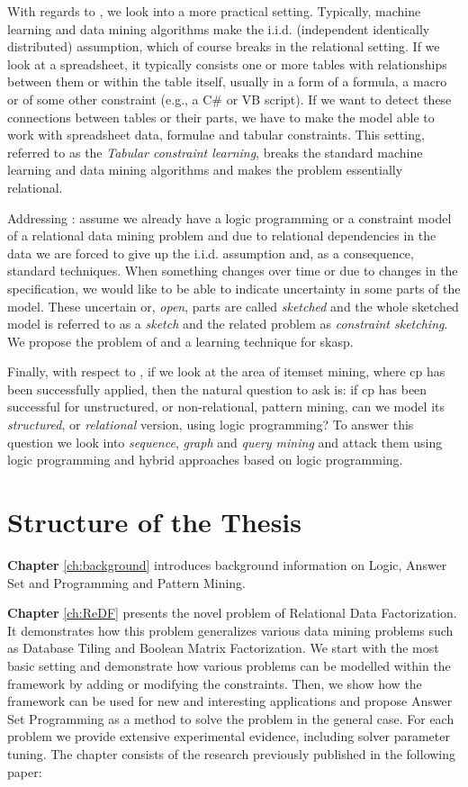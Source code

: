 With regards to \ctwo, we look into a more practical setting.
Typically, machine learning and data mining algorithms make the i.i.d.
(independent identically distributed) assumption, which of course
breaks in the relational setting. If we look at a spreadsheet, it 
typically consists one or more tables with relationships between them or
within the table itself, usually
in a form of a formula, a macro or of some other constraint (e.g., a
C\# or VB script). If we
want to detect these connections between tables or their parts, we
have to make the model able to work with spreadsheet data, 
formulae and tabular constraints. This setting, referred to as the
\textit{Tabular constraint learning}, breaks the standard
machine learning and data mining algorithms and 
makes the problem essentially relational.

Addressing \cthree: assume we already have a logic programming or a
constraint model of a relational
data mining problem and due to relational dependencies in the data we are
forced to give up the i.i.d. assumption and, as a consequence,
standard techniques. When something changes over time or due to changes in the specification, we would like
to be able to indicate uncertainty in some parts of the model. These
uncertain or, \textit{open}, parts are called \textit{sketched} and
the whole sketched model is referred to as a \textit{sketch} and the related
problem as \textit{constraint sketching}. We propose the problem of and
a learning technique for \acrlong{skasp}.


Finally, with respect to \cfour, if we look at the area of itemset mining, where \acrlong{cp}
has been successfully applied, then the natural question to ask is:
if \acrshort{cp} has been successful for unstructured, or
non-relational, pattern mining, can we model its \textit{structured},
or \textit{relational} version, using logic programming? To answer
this question we look into \textit{sequence}, \textit{graph} and
\textit{query mining} and attack them using logic programming and
hybrid approaches based on logic programming.


\section{Structure of the Thesis}
\textbf{Chapter} \ref{ch:background} introduces background information
on Logic, Answer Set and Programming and Pattern Mining.

\textbf{Chapter} \ref{ch:ReDF} presents the novel problem of Relational Data
Factorization. It demonstrates how this problem generalizes various
data mining problems such as Database Tiling and Boolean Matrix
Factorization. We start with the most basic setting and demonstrate
how various problems can be modelled within the framework by adding
or modifying the constraints. Then, we show how the framework can be
used for new and interesting applications and propose Answer Set
Programming as a method to solve the problem in the general case.
For each problem we provide extensive experimental evidence,
including solver parameter tuning. The chapter consists of the
research previously published in the following paper:

